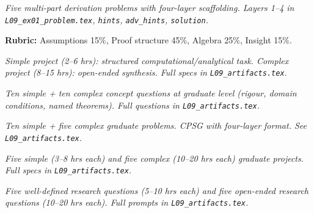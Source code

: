 \begin{tcolorbox}[ugprobbox, title={CPSU · L09 · Tier 3 · 3–6 hrs (4-layer)}]
\textit{Five multi-part derivation problems with four-layer scaffolding.
Layers 1–4 in \texttt{L09_ex01\_problem.tex}, \texttt{hints}, \texttt{adv\_hints}, \texttt{solution}.}

\textbf{Rubric:} Assumptions 15\%, Proof structure 45\%, Algebra 25\%, Insight 15\%.
\end{tcolorbox}

\begin{tcolorbox}[ugprobbox, title={SPJU + CPJU · L09 · Tiers 2–3}]
\textit{Simple project (2–6 hrs): structured computational/analytical task.
Complex project (8–15 hrs): open-ended synthesis.
Full specs in \texttt{L09_artifacts.tex}.}
\end{tcolorbox}

\begin{tcolorbox}[gradconceptbox, title={SCQG + CCQG · L09 · Tiers 4–5}]
\textit{Ten simple + ten complex concept questions at graduate level (rigour, domain
conditions, named theorems). Full questions in \texttt{L09_artifacts.tex}.}
\end{tcolorbox}

\begin{tcolorbox}[gradprobbox, title={SPSG + CPSG · L09 · Tiers 4–5}]
\textit{Ten simple + five complex graduate problems.
CPSG with four-layer format. See \texttt{L09_artifacts.tex}.}
\end{tcolorbox}

\begin{tcolorbox}[gradprobbox, title={SPJG (×5) + CPJG (×5) · L09 · Tiers 4–5}]
\textit{Five simple (3–8 hrs each) and five complex (10–20 hrs each) graduate projects.
Full specs in \texttt{L09_artifacts.tex}.}
\end{tcolorbox}

\begin{tcolorbox}[researchbox, title={WRQ (×5) + ORQ (×5) · L09 · Tiers 4–5}]
\textit{Five well-defined research questions (5–10 hrs each) and five open-ended
research questions (10–20 hrs each). Full prompts in \texttt{L09_artifacts.tex}.}
\end{tcolorbox}
